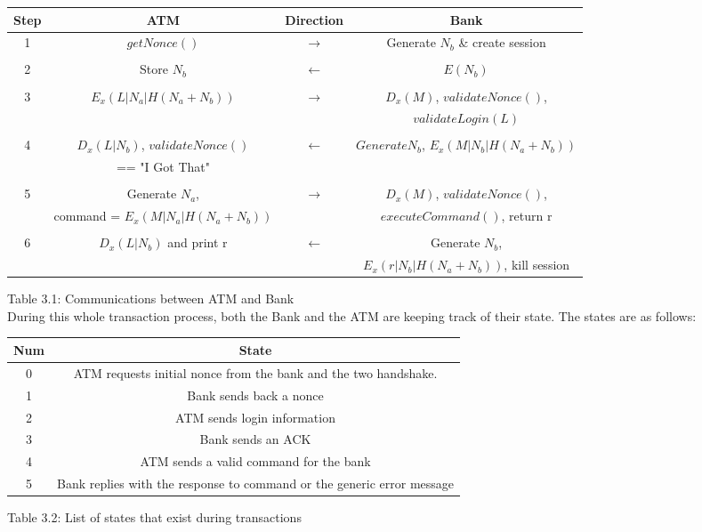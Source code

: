 \documentclass[10pt,a4paper]{article}
\begin{document}
\begin{tabular}{|c|ccc|}
	\hline
Step &  ATM  & Direction & Bank \\
	\hline
1   & $getNonce()$ & $\rightarrow$ & Generate $N_b$ \& create session  \\\\
2   & Store $N_b$ & $\leftarrow$ & $E(N_b)$  \\\\
3   & $E_x(L|N_a|H(N_a + N_b))$ & $\rightarrow$ & $D_x(M)$, $validateNonce()$,\\
	& & & $validateLogin(L)$ \\\\
4   & $D_x(L|N_b)$, $validateNonce()$ & $\leftarrow$ & $Generate N_b$, $E_x(M|N_b|H(N_a+N_b))$ \\  & == "I Got That" & &\\\\
5   & Generate $N_a$, & $\rightarrow$ & $D_x(M)$, $validateNonce()$, \\
	& command = $E_x(M|N_a|H(N_a+N_b))$ & & $executeCommand()$, return r\\\\
6   & $D_x(L|N_b)$ and print r & $\leftarrow$ & Generate $N_b$, \\
	& & & $E_x(r|N_b|H(N_a+N_b))$, kill session\\
	\hline
\end{tabular}

{\footnotesize Table 3.1: Communications between ATM and Bank}\\

During this whole transaction process, both the Bank and the ATM are keeping track of their state. The states are as follows:\\

\begin{tabular}{|c|c|}
	\hline
Num & State\\
	\hline
0 & ATM requests initial nonce from the bank and the two handshake.\\
1 & Bank sends back a nonce\\
2 & ATM sends login information\\
3 & Bank sends an ACK\\
4 & ATM sends a valid command for the bank\\
5 & Bank replies with the response to command or the generic error message\\
	\hline
\end{tabular}

{\footnotesize Table 3.2: List of states that exist during transactions}\\
\end{document}
